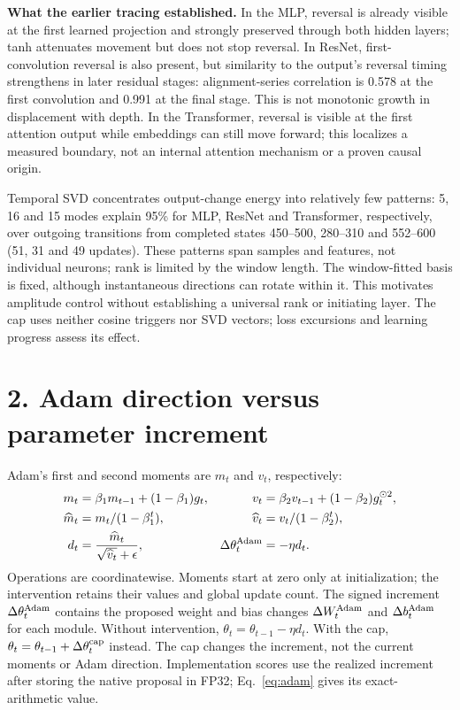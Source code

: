 \documentclass[11pt,a4paper]{article}
\newcommand{\sect}[1]{\vspace{2pt}\section*{#1}\vspace{-4pt}}
\begin{document}
\textbf{What the earlier tracing established.}
In the MLP, reversal is already visible at the first learned projection and
strongly preserved through both hidden layers; tanh attenuates movement but
does not stop reversal. In ResNet, first-convolution reversal is also present,
but similarity to the output's reversal timing strengthens in later residual
stages: alignment-series correlation is 0.578 at the first convolution and
0.991 at the final stage. This is not monotonic growth in displacement with depth.
In the Transformer, reversal is visible at the first attention output while
embeddings can still move forward; this localizes a measured boundary, not an
internal attention mechanism or a proven causal origin.

Temporal SVD concentrates output-change energy into relatively few patterns:
5, 16 and 15 modes explain 95\% for MLP, ResNet and Transformer, respectively,
over outgoing transitions from completed states 450--500, 280--310 and 552--600
(51, 31 and 49 updates).
These patterns span samples and features, not individual neurons; rank is limited
by the window length. The window-fitted basis is fixed, although instantaneous
directions can rotate within it. This motivates amplitude control without
establishing a universal rank or initiating layer. The cap uses neither cosine
triggers nor SVD vectors; loss excursions and learning progress assess its effect.

\newpage
\sect{2. Adam direction versus parameter increment}
Adam's first and second moments are $m_t$ and $v_t$, respectively:
\begin{equation}
 \begin{aligned}
 m_t&=\beta_1m_{t-1}+(1-\beta_1)g_t,
 &v_t&=\beta_2v_{t-1}+(1-\beta_2)g_t^{\odot2},\\
 \widehat m_t&=m_t/(1-\beta_1^t),
 &\widehat v_t&=v_t/(1-\beta_2^t),\\
 d_t&=\frac{\widehat m_t}{\sqrt{\widehat v_t}+\epsilon},
 &\Delta\theta_t^{\rm Adam}&=-\eta d_t.
 \end{aligned}
 \label{eq:adam}
\end{equation}
Operations are coordinatewise. Moments start at zero only at initialization;
the intervention retains their values and global update count. The signed increment
$\Delta\theta_t^{\rm Adam}$ contains the proposed weight and bias changes
$\Delta W_t^{\rm Adam}$ and $\Delta b_t^{\rm Adam}$ for each module.
Without intervention, $\theta_t=\theta_{t-1}-\eta d_t$.
With the cap, $\theta_t=\theta_{t-1}+\Delta\theta_t^{\rm cap}$ instead.
The cap changes the increment, not the current moments or Adam direction.
Implementation scores use the realized increment after storing the native
proposal in FP32; Eq.~\eqref{eq:adam} gives its exact-arithmetic value.
\end{document}
